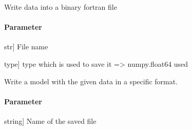 \documentclass[letterpaper,10pt,english]{sphinxmanual}
\begin{document}
\begin{fulllineitems}
\begin{fulllineitems}
\begin{description}
\end{description}

\end{fulllineitems}


\begin{fulllineitems}
\label{\detokenize{classes:model.Model.write}}
\pysigstartsignatures
{}
\pysigstopsignatures
\sphinxAtStartPar
Write data into a binary fortran file


\paragraph{Parameter}
\label{\detokenize{classes:id8}}\begin{description}
\sphinxlineitem{fname}{[}str{]}
\sphinxAtStartPar
File name

\sphinxlineitem{fmt\_type}{[}type{]}
\sphinxAtStartPar
type which is used to save it =\textgreater{} numpy.float64 used

\end{description}

\end{fulllineitems}


\begin{fulllineitems}
\label{\detokenize{classes:model.Model.write_model}}
\pysigstartsignatures
{}
\pysigstopsignatures
\sphinxAtStartPar
Write a model with the given data in a specific format.


\paragraph{Parameter}
\label{\detokenize{classes:id9}}\begin{description}
\sphinxlineitem{filename}{[}string{]}
\sphinxAtStartPar
Name of the saved file


\end{description}
\end{fulllineitems}
\end{fulllineitems}
\end{document}

